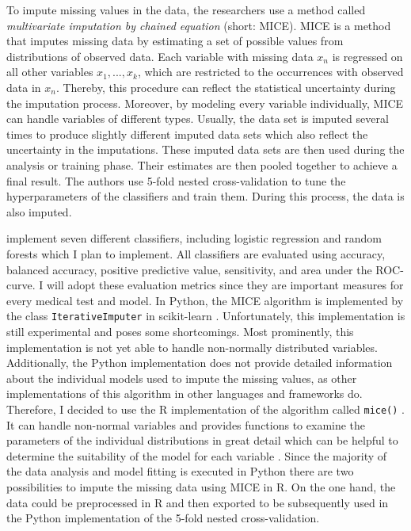 \documentclass[12pt,a4paper,oneside]{article}
\newcommand{\code}{\texttt}
\begin{document}
To impute missing values in the data, the researchers use a method called \textit{multivariate imputation by chained equation} (short: MICE). MICE is a method that imputes missing data by estimating a set of possible values from distributions of observed data. Each variable with missing data $x_n$ is regressed on all other variables $x_1, ..., x_k$, which are restricted to the occurrences with observed data in $x_n$. Thereby, this procedure can reflect the statistical uncertainty during the imputation process. Moreover, by modeling every variable individually, MICE can handle variables of different types. Usually, the data set is imputed several times to produce slightly different imputed data sets which also reflect the uncertainty in the imputations. These imputed data sets are then used during the analysis or training phase. Their estimates are then pooled together to achieve a final result. \cite{RN141,RN142, RN144} The authors use 5-fold nested cross-validation to tune the hyperparameters of the classifiers and train them. During this process, the data is also imputed.
\par
\citeauthor{RN127} implement seven different classifiers, including logistic regression and random forests which I plan to implement. All classifiers are evaluated using accuracy, balanced accuracy, positive predictive value, sensitivity, and area under the ROC-curve. I will adopt these evaluation metrics since they are important measures for every medical test and model.
In Python, the MICE algorithm is implemented by the class \code{IterativeImputer} in scikit-learn \cite{scikit-learn}. Unfortunately, this implementation is still experimental and poses some shortcomings. Most prominently, this implementation is not yet able to handle non-normally distributed variables. Additionally, the Python implementation does not provide detailed information about the individual models used to impute the missing values, as other implementations of this algorithm in other languages and frameworks do. Therefore, I decided to use the R implementation of the algorithm called \code{mice()} \cite{RN135}. It can handle non-normal variables and provides functions to examine the parameters of the individual distributions in great detail which can be helpful to determine the suitability of the model for each variable \cite{RN142}. Since the majority of the data analysis and model fitting is executed in Python there are two possibilities to impute the missing data using MICE in R. On the one hand, the data could be preprocessed in R and then exported to be subsequently used in the Python implementation of the 5-fold nested cross-validation. 
\end{document}
